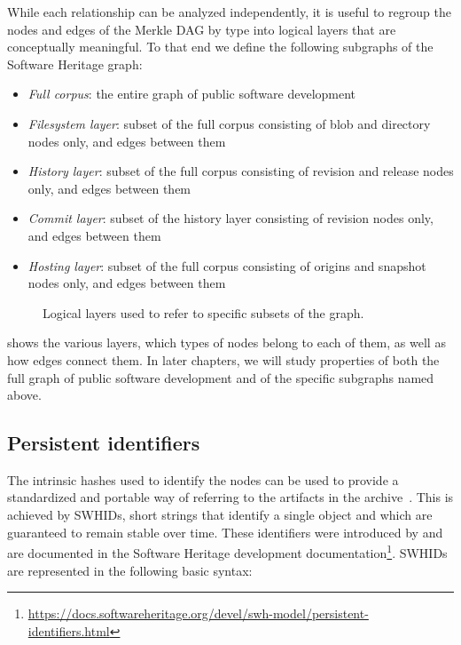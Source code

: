 While each relationship can be analyzed independently, it is useful to regroup
the nodes and edges of the Merkle \gls{DAG} by type into logical layers that
are conceptually meaningful.  To that end we define the following subgraphs of
the Software Heritage graph:
\begin{itemize}

\item \emph{Full corpus}: the entire graph of public software development

\item \emph{Filesystem layer}: subset of the full corpus consisting of blob and
  directory nodes only, and edges between them

\item \emph{History layer}: subset of the full corpus consisting of revision and
  release nodes only, and edges between them

\item \emph{Commit layer}: subset of the history layer consisting of revision
  nodes only, and edges between them

\item \emph{Hosting layer}: subset of the full corpus consisting of origins and
  snapshot nodes only, and edges between them

\end{itemize}

\begin{figure}
    \centering
    
    \caption{Logical layers used to refer to specific subsets of the graph.}%
    \label{fig:layers}
\end{figure}
 shows the various layers, which types of nodes belong to
each of them, as well as how edges connect them. In later chapters, we will
study properties of both the full graph of public software development and of
the specific subgraphs named above.


\subsection{Persistent identifiers}%
\label{sec:swhid}

The intrinsic hashes used to identify the nodes can be used to provide a
standardized and portable way of referring to the artifacts in the
archive~\cite{swhipres2018}. This is achieved by \glspl{SWHID},
short strings that identify a single object and which are guaranteed to remain
stable over time.  These identifiers were introduced by
\textcite{cise-2020-doi} and are documented in the Software Heritage
development
documentation\footnote{\url{https://docs.softwareheritage.org/devel/swh-model/persistent-identifiers.html}}.
\glspl{SWHID} are represented in the following basic syntax:


